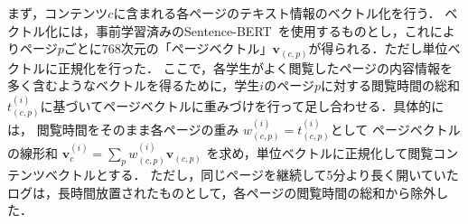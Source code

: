\documentclass[platex,dvipdfmx,a4paper,twocolumn,base=10pt,jbase=10pt,ja=standard]{bxjsarticle}
\begin{document}
\quad
まず，コンテンツ${c}$に含まれる各ページのテキスト情報のベクトル化を行う．
ベクトル化には，事前学習済みのSentence-BERT~\cite{sonoisa}を使用するものとし，これによりページ$p$ごとに768次元の「ページベクトル」$\bm{v}_{(c,p)}$が得られる．ただし単位ベクトルに正規化を行った．
ここで，各学生がよく閲覧したページの内容情報を多く含むようなベクトルを得るために，学生$i$のページ$p$に対する閲覧時間の総和$t^{(i)}_{(c,p)}$に基づいてページベクトルに重みづけを行って足し合わせる．具体的には，
閲覧時間をそのまま各ページの重み $w^{(i)}_{(c,p)} = t^{(i)}_{(c,p)}$として
ページベクトルの線形和 $\bm{v}^{(i)}_c = \sum_p w^{(i)}_{(c,p)}\bm{v}_{(c,p)}$ を求め，単位ベクトルに正規化して閲覧コンテンツベクトルとする．
ただし，同じページを継続して5分より長く開いていたログは，長時間放置されたものとして，各ページの閲覧時間の総和から除外した．

\end{document}
